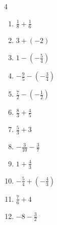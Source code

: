 \begin{multicols}{4}
\begin{enumerate}

  \item $\displaystyle \frac{1}{8} + \frac{1}{6}$


  \item $\displaystyle 3 + \left(-2\right)$

        \phantom{$\displaystyle =1$}

  \item $\displaystyle 1 - \left(-\frac{5}{4}\right)$


  \item $\displaystyle -\frac{9}{5} - \left(-\frac{3}{4}\right)$


\columnbreak %

  \item $\displaystyle \frac{7}{2} - \left(-\frac{1}{2}\right)$

        \phantom{$\displaystyle =4$}

  \item $\displaystyle \frac{8}{3} + \frac{4}{5}$


  \item $\displaystyle \frac{5}{3} + 3$


  \item $\displaystyle -\frac{3}{10} - \frac{3}{7}$


  \item $\displaystyle 1 + \frac{4}{3}$


  \item $\displaystyle -\frac{5}{4} + \left(-\frac{4}{3}\right)$


  \item $\displaystyle \frac{7}{6} + 4$


  \item $\displaystyle -8 - \frac{3}{2}$


\end{enumerate}
\end{multicols}
